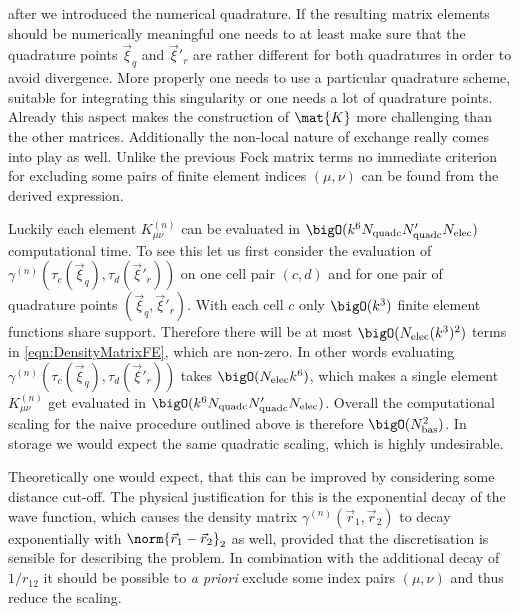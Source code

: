 after we introduced the numerical quadrature.
If the resulting matrix elements should be numerically meaningful
one needs to at least make sure that the quadrature
points $\vec{\xi}_q$ and $\vec{\xi}'_r$ are rather different for both
quadratures in order to avoid divergence.
More properly one needs to use a particular quadrature scheme,
suitable for integrating this singularity
or one needs a lot of quadrature points.
Already this aspect makes the construction of $\mat{K}$ more challenging
than the other matrices.
Additionally the non-local nature of \HF exchange really comes
into play as well.
Unlike the previous Fock matrix terms
no immediate criterion for excluding some
pairs of finite element indices $(\mu, \nu)$ can be found
from the derived expression.

Luckily each element $K^{(n)}_{\mu\nu}$
can be evaluated in $\bigO(k^6 \Nquadc \Nquadc' \Nelec)$
computational time.
To see this let us first consider the evaluation of
$\gamma^{(n)}\!\left(\tau_c(\vec{\xi}_q), \tau_d(\vec{\xi}'_r)\right)$
on one cell pair $(c,d)$ and for one pair
of quadrature points $(\vec{\xi}_q, \vec{\xi}'_r)$.
With each cell $c$ only $\bigO(k^3)$ finite element functions share support.
Therefore
there will be at most $\bigO(\Nelec (k^3)^2)$
terms in \eqref{eqn:DensityMatrixFE}, which are non-zero.
In other words evaluating
$\gamma^{(n)}\!\left(\tau_c(\vec{\xi}_q), \tau_d(\vec{\xi}'_r)\right)$
takes $\bigO(\Nelec k^6)$,
which makes a single element $K^{(n)}_{\mu\nu}$ get evaluated
in $\bigO(k^6 \Nquadc \Nquadc' \Nelec)$.
Overall the computational scaling for the naive
procedure outlined above is therefore $\bigO(\Nbas^2)$.
In storage we would expect the same quadratic scaling,
which is highly undesirable.

Theoretically one would expect,
that this can be improved by considering some distance cut-off.
The physical justification for this is the exponential decay of the wave function,
which causes the density matrix $\gamma^{(n)}(\vec{r}_1, \vec{r}_2)$
to decay exponentially with $\norm{\vec{r}_1 - \vec{r}_2}_2$
as well,
provided that the discretisation is sensible for describing the problem.
In combination with the additional decay of $1/r_{12}$
it should be possible to \textit{a priori} exclude some index pairs $(\mu, \nu)$
and thus reduce the scaling.

